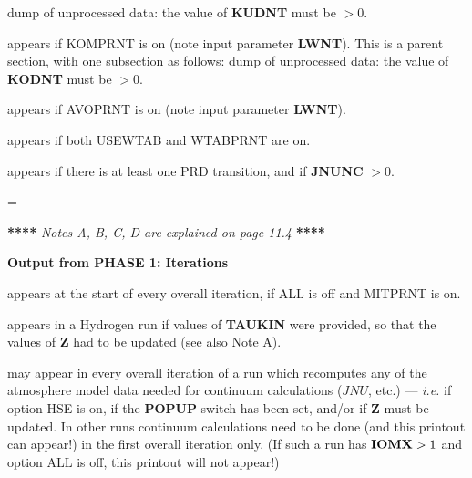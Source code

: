 \bull dump of unprocessed data: the value of {\bf KUDNT} must be $ > 0$.
\blankline
{} \par
appears if KOMPRNT is on (note input parameter {\bf LWNT}).
This is a parent section, with one subsection as follows:
\bull dump of unprocessed data: the value of {\bf KODNT} must be $ > 0$.
\blankline
{} \par
appears if AVOPRNT is on (note input parameter {\bf LWNT}).
\blankline
{} \par
appears if both USEWTAB and WTABPRNT are on.
\blankline
{} \par
appears if there is at least one PRD transition, and if {\bf JNUNC} $> 0$.
\ej

\headline={\centerline{{\bf *****}
{\it Notes A, B, C, D are explained on page 11.4 } {\bf *****}}}

\centerline{\bf Output from {\rm PHASE 1}: Iterations}
\blankline
\blankline
\blankline
{} \par
appears at the start of every overall iteration, if ALL is off and
MITPRNT is on.
\blankline
{} \par
appears in a Hydrogen run if values of {\bf TAUKIN} were provided, 
so that the values of {\bf Z} had to be updated (see also Note A).
\blankline
{} \par
may appear in every overall iteration of a run which recomputes any
of the atmosphere model data needed for continuum calculations ($JNU$, etc.)
--- {\it i.e.} if option HSE is on, if the {\bf POPUP} switch has been
set, and/or if {\bf Z} must be updated. In other runs continuum calculations
need to be done (and this printout can appear!) in the first overall
iteration only. (If such a run has ${\bf IOMX} > 1$ and option ALL
is off, this printout will not appear!)


